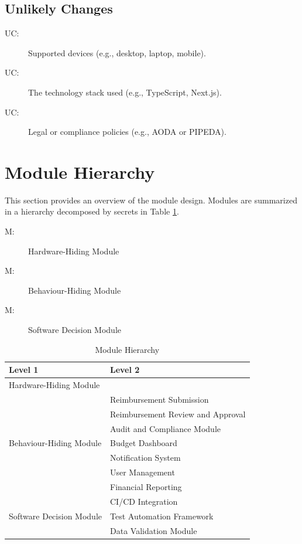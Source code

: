 \documentclass[12pt, titlepage]{article}
\newcounter{ucnum}
\newcommand{\uctheucnum}{UC\theucnum}
\newcounter{mnum}
\newcommand{\mthemnum}{M\themnum}
\begin{document}
\subsection{Unlikely Changes} \label{SecUchange}

\begin{description}
\item[ \uctheucnum \label{ucDevice}:] Supported devices (e.g., desktop, laptop, mobile).
\item[ \uctheucnum \label{ucTechStack}:] The technology stack used (e.g., TypeScript, Next.js).
\item[ \uctheucnum \label{ucPolicy}:] Legal or compliance policies (e.g., AODA or PIPEDA).
\end{description}

\section{Module Hierarchy} \label{SecMH}

This section provides an overview of the module design. Modules are summarized
in a hierarchy decomposed by secrets in Table \ref{TblMH}. 

\begin{description}
\item [ \mthemnum \label{mHH}:] Hardware-Hiding Module
\item [ \mthemnum \label{mBH}:] Behaviour-Hiding Module
\item [ \mthemnum \label{mSD}:] Software Decision Module
\end{description}

\begin{table}[h!]
\centering
\begin{tabular}{p{} p{}}
\toprule
\textbf{Level 1} & \textbf{Level 2}\\
\midrule

{Hardware-Hiding Module} & ~ \\
\midrule

\multirow{7}{0.3\textwidth}{Behaviour-Hiding Module} & Reimbursement Submission\\
& Reimbursement Review and Approval\\
& Audit and Compliance Module\\
& Budget Dashboard\\
& Notification System\\
& User Management\\ 
& Financial Reporting\\
\midrule

\multirow{3}{0.3\textwidth}{Software Decision Module} & CI/CD Integration\\
& Test Automation Framework\\
& Data Validation Module\\
\bottomrule

\end{tabular}
\caption{Module Hierarchy}
\label{TblMH}
\end{table}
\end{document}
